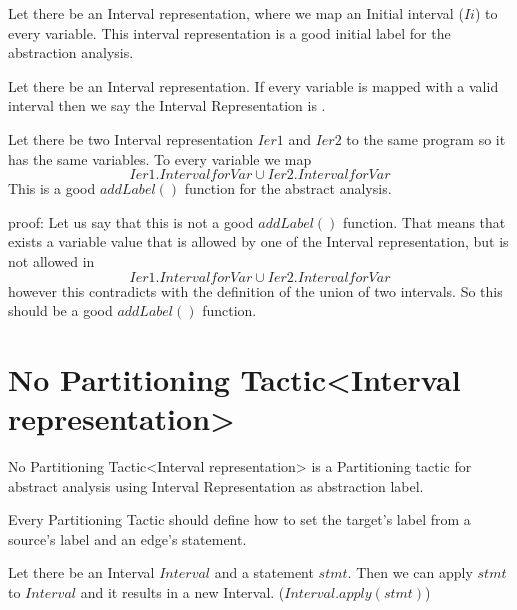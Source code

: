 \begin{theorem}	
	Let there be an Interval representation, where we map an Initial interval ($Ii$) to every variable. This interval representation is a good initial label for the abstraction analysis.
\end{theorem}

\begin{definition}
	Let there be an Interval representation. If every variable is mapped with a valid interval then we say the Interval Representation is .
\end{definition}

\begin{theorem}	
	Let there be two Interval representation $Ier1$ and $Ier2$ to the same program so it has the same variables. To every variable we map \[Ier1.IntervalforVar \cup Ier2.IntervalforVar\]This is a good $addLabel()$ function for the abstract analysis.
\end{theorem}
	
	{proof:} Let us say that this is not a good $addLabel()$ function. That means that exists a variable value that is allowed by one of the Interval representation, but is not allowed in \[Ier1.IntervalforVar \cup Ier2.IntervalforVar\] however this contradicts with the definition of the union of two intervals. So this should be a good $addLabel()$ function.	

\section{No Partitioning Tactic<Interval representation>}

\begin{definition}
	No Partitioning Tactic<Interval representation> is a Partitioning tactic for abstract analysis using Interval Representation as abstraction label.
\end{definition}

Every Partitioning Tactic should define how to set the target's label from a source's label and an edge's statement.

\begin{definition}
	Let there be an Interval $Interval$ and a statement $stmt$. Then we can apply $stmt$ to $Interval$ and it results in a new Interval. ($Interval.apply(stmt)$)
\end{definition}

